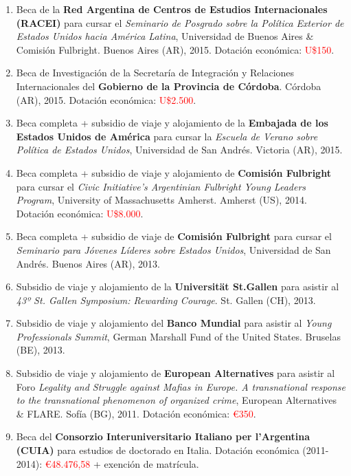 \documentclass[12pt]{article}
\begin{document}
\begin{enumerate}
\item Beca de la {\bf Red Argentina de Centros de Estudios Internacionales (RACEI)} para cursar el {\it Seminario de Posgrado sobre la Política Exterior de Estados Unidos hacia América Latina}, Universidad de Buenos Aires \& Comisión Fulbright. Buenos Aires (AR), 2015. Dotación económica: \textcolor{red}{U\$150}.

\item Beca de Investigación de la Secretaría de Integración y Relaciones Internacionales del {\bf Gobierno de la Provincia de Córdoba}. Córdoba (AR), 2015. Dotación económica: \textcolor{red}{U\$2.500}.

\item Beca completa + subsidio de viaje y alojamiento de la {\bf Embajada de los Estados Unidos de América} para cursar la {\it Escuela de Verano sobre Política de Estados Unidos}, Universidad de San Andrés. Victoria (AR), 2015.

\item Beca completa + subsidio de viaje y alojamiento de {\bf Comisión Fulbright} para cursar el {\it Civic Initiative’s Argentinian Fulbright Young Leaders Program}, University of Massachusetts Amherst. Amherst (US), 2014. Dotación económica: \textcolor{red}{U\$8.000}.

\item Beca completa + subsidio de viaje de {\bf Comisión Fulbright} para cursar el {\it Seminario para Jóvenes Líderes sobre Estados Unidos}, Universidad de San Andrés. Buenos Aires (AR), 2013.

\item Subsidio de viaje y alojamiento de la {\bf Universität St.Gallen} para asistir al {\it 43º St. Gallen Symposium: Rewarding Courage}. St. Gallen (CH), 2013.

\item Subsidio de viaje y alojamiento del {\bf Banco Mundial} para asistir al {\it Young Professionals Summit}, German Marshall Fund of the United States. Bruselas (BE), 2013.

\item Subsidio de viaje y alojamiento de {\bf European Alternatives} para asistir al Foro {\it Legality and Struggle against Mafias in Europe. A transnational response to the transnational phenomenon of organized crime}, European Alternatives \& FLARE. Sofía (BG), 2011. Dotación económica: \textcolor{red}{€350}.

\item Beca del {\bf Consorzio Interuniversitario Italiano per l’Argentina (CUIA)} para estudios de doctorado en Italia. Dotación económica (2011-2014): \textcolor{red}{€48.476,58} + exención de matrícula.


\end{enumerate}
\end{document}

